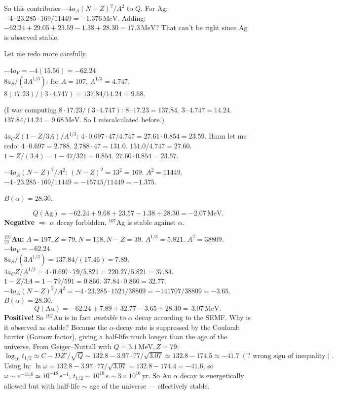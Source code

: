 \documentclass[11pt]{article}
\newcommand{\MeV}{\,\mathrm{MeV}}
\begin{document}
So this contributes $-4 a_A(N-Z)^{2}/A^{2}$ to $Q$. For Ag: $-4\cdot 23.285\cdot 169/11449=-1.376\MeV$. Adding: $-62.24+29.05+23.59-1.38+28.30=\boxed{17.3\MeV}$? That can't be right since Ag is observed stable.

Let me redo more carefully.

$-4 a_V=-4(15.56)=-62.24$\\
$8 a_S/(3 A^{1/3})$: for $A=107$, $A^{1/3}=4.747$. $8(17.23)/(3\cdot 4.747)=137.84/14.24=9.68$. 

(I was computing $8\cdot 17.23/(3\cdot 4.747)$: $8\cdot 17.23=137.84$. $3\cdot 4.747=14.24$. $137.84/14.24=9.68\MeV$. So I miscalculated before.)

$4 a_C Z(1-Z/3A)/A^{1/3}$: $4\cdot 0.697\cdot 47/4.747=27.61\cdot 0.854=23.59$. Hmm let me redo: $4\cdot 0.697=2.788$. $2.788\cdot 47=131.0$. $131.0/4.747=27.60$. $1-Z/(3A)=1-47/321=0.854$. $27.60\cdot 0.854=23.57$.

$-4 a_A(N-Z)^{2}/A^{2}$: $(N-Z)^{2}=13^{2}=169$. $A^{2}=11449$. $-4\cdot 23.285\cdot 169/11449=-15745/11449=-1.375$.

$B(\alpha)=28.30$.

\[
Q(\mathrm{Ag})=-62.24+9.68+23.57-1.38+28.30=-2.07\MeV.
\]
\textbf{Negative} $\Rightarrow$ $\alpha$ decay forbidden, $^{107}$Ag is stable against $\alpha$. \checkmark

\textbf{$^{197}_{79}$Au:} $A=197,Z=79,N=118,N-Z=39$. $A^{1/3}=5.821$. $A^{2}=38809$.\\
$-4 a_V=-62.24$.\\
$8 a_S/(3 A^{1/3})=137.84/(17.46)=7.89$.\\
$4 a_C Z/A^{1/3}=4\cdot 0.697\cdot 79/5.821=220.27/5.821=37.84$. $1-Z/3A=1-79/591=0.866$. $37.84\cdot 0.866=32.77$.\\
$-4 a_A(N-Z)^{2}/A^{2}=-4\cdot 23.285\cdot 1521/38809=-141707/38809=-3.65$.\\
$B(\alpha)=28.30$.
\[
Q(\mathrm{Au})=-62.24+7.89+32.77-3.65+28.30=\boxed{\,3.07\MeV.\,}
\]
\textbf{Positive!} So $^{197}$Au is in fact \emph{unstable} to $\alpha$ decay according to the SEMF. Why is it observed as stable? Because the $\alpha$-decay rate is suppressed by the Coulomb barrier (Gamow factor), giving a half-life much longer than the age of the universe. From Geiger--Nuttall with $Q=3.1\MeV,Z=79$:
\[
\log_{10}t_{1/2}\simeq C-D Z'/\sqrt{Q}\sim 132.8-3.97\cdot 77/\sqrt{3.07}\simeq 132.8-174.5\simeq -41.7\;(?\text{ wrong sign of inequality}).
\]
Using ln: $\ln\omega=132.8-3.97\cdot 77/\sqrt{3.07}=132.8-174.4=-41.6$, so $\omega\sim e^{-41.6}\simeq 10^{-18}\,\mathrm{s}^{-1}$, $t_{1/2}\sim 10^{18}\,\mathrm{s}\sim 3\times 10^{10}\,\mathrm{yr}$. So Au $\alpha$ decay is energetically allowed but with half-life $\sim$ age of the universe --- effectively stable.
\end{document}
